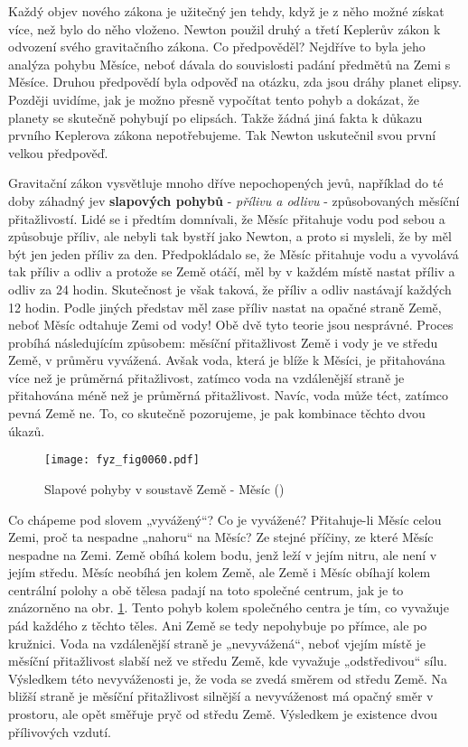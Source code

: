     Každý objev nového zákona je užitečný jen tehdy, když je z něho možné získat více, než bylo do 
    něho vloženo. Newton použil druhý a třetí Keplerův zákon k odvození svého gravitačního zákona. 
    Co předpověděl? Nejdříve to byla jeho analýza pohybu Měsíce, neboť dávala do souvislosti padání 
    předmětů na Zemi s  Měsíce. Druhou předpovědí byla odpověď na otázku, zda jsou 
    dráhy planet elipsy. Později uvidíme, jak je možno přesně vypočítat tento pohyb a dokázat, že 
    planety se skutečně pohybují po elipsách. Takže žádná jiná fakta k důkazu prvního Keplerova 
    zákona nepotřebujeme. Tak Newton uskutečnil svou první velkou předpověď.

    Gravitační zákon vysvětluje mnoho dříve nepochopených jevů, například do té doby záhadný jev 
    \textbf{slapových pohybů} - \emph{přílivu a odlivu} - způsobovaných měsíční přitažlivostí. Lidé 
    se i předtím domnívali, že Měsíc přitahuje vodu pod sebou a způsobuje příliv, ale nebyli tak 
    bystří jako Newton, a proto si mysleli, že by měl být jen jeden příliv za den. Předpokládalo 
    se, že Měsíc přitahuje vodu a vyvolává tak příliv a odliv a protože se Země otáčí, měl by v 
    každém místě nastat příliv a odliv za \num{24} hodin. Skutečnost je však taková, že příliv a 
    odliv nastávají každých \num{12} hodin. Podle jiných představ měl zase příliv nastat na opačné 
    straně Země, neboť Měsíc odtahuje Zemi od vody! Obě dvě tyto teorie jsou nesprávné. Proces 
    probíhá následujícím způsobem: měsíční přitažlivost Země i vody je ve středu Země, v průměru 
    vyvážená. Avšak voda, která je blíže k Měsíci, je přitahována více než je průměrná 
    přitažlivost, zatímco voda na vzdálenější straně je přitahována méně než je průměrná 
    přitažlivost. Navíc, voda může téct, zatímco pevná Země ne. To, co skutečně pozorujeme, je pak 
    kombinace těchto dvou úkazů.

    \begin{figure}[ht!]  %
      \centering
      \texttt{[image: fyz\_fig0060.pdf]}
      \caption{Slapové pohyby v soustavě Země - Měsíc (\cite[s.~97]{Feynman01})}
      \label{fyz:fig0060}
    \end{figure}
    Co chápeme pod slovem „vyvážený“? Co je vyvážené? Přitahuje-li Měsíc celou Zemi, proč ta 
    nespadne „nahoru“ na Měsíc? Ze stejné příčiny, ze které Měsíc nespadne na Zemi. Země obíhá 
    kolem bodu, jenž leží v jejím nitru, ale není v jejím středu. Měsíc neobíhá jen kolem Země, ale 
    Země i Měsíc obíhají kolem centrální polohy a obě tělesa padají na toto společné centrum, jak 
    je to znázorněno na obr. \ref{fyz:fig0060}. Tento pohyb kolem společného centra je tím, co 
    vyvažuje pád každého z těchto těles. Ani Země se tedy nepohybuje po přímce, ale po kružnici. 
    Voda na vzdálenější straně je „nevyvážená“, neboť vjejím místě je měsíční přitažlivost slabší 
    než ve středu Země, kde vyvažuje „odstředivou“ sílu. Výsledkem této nevyváženosti je, že voda 
    se zvedá směrem od středu Země. Na bližší straně je měsíční přitažlivost silnější a 
    nevyváženost má opačný směr v prostoru, ale opět směřuje pryč od středu Země. Výsledkem je 
    existence dvou přílivových vzdutí.
    
